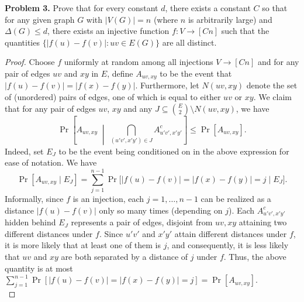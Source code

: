 \documentclass[11pt,letterpaper]{report}
\begin{document}
\noindent\textbf{Problem 3. }
Prove that for every constant $d$, there exists a constant $C$ so that for any given graph $G$ with $|V(G)| = n$ (where $n$ is arbitrarily large) and $\Delta(G)\leq d$, there exists an injective function $f: V\to [Cn]$ such that the quantities $\{|f(u)-f(v)|: uv\in E(G)\}$ are all distinct.

\begin{proof}
    Choose $f$ uniformly at random among all injections $V\to [Cn]$ and for any pair of edges $uv$ and $xy$ in $E$, define $A_{uv,xy}$ to be the event that $|f(u)-f(v)| = |f(x)-f(y)|$.
    Furthermore, let $N(uv, xy)$ denote the set of (unordered) pairs of edges, one of which is equal to either $uv$ or $xy$.
    We claim that for any pair of edges $uv$, $xy$ and any $J\subseteq \binom{E}{2}\setminus N(uv, xy)$, we have
    \[
        \Pr\left[ A_{uv, xy} \;\middle|\; \bigcap_{(u'v', x'y')\in J}A_{u'v', x'y'}^c  \right] \leq \Pr[A_{uv, xy}].
    \]
    Indeed, set $E_J$ to be the event being conditioned on in the above expression for ease of notation.
    We have
    \[
        \Pr[A_{uv,xy} \mid E_J] = \sum_{j=1}^{n-1}\Pr\bigg[|f(u)-f(v)| = |f(x)-f(y)| = j \mid E_J\bigg].
    \]
    Informally, since $f$ is an injection, each $j = 1, \ldots, n-1$ can be realized as a distance $|f(u)-f(v)|$ only so many times (depending on $j$).
    Each $A_{u'v', x'y'}^c$ hidden behind $E_J$ represents a pair of edges, disjoint from $uv, xy$ attaining two different distances under $f$.
    Since $u'v'$ and $x'y'$ attain different distances under $f$, it is more likely that at least one of them is $j$, and consequently, it is less likely that $uv$ and $xy$ are both separated by a distance of $j$ under $f$.
    Thus, the above quantity is at most $\sum_{j=1}^{n-1}\Pr[|f(u)-f(v)| = |f(x)-f(y)| = j] = \Pr[A_{uv,xy}]$.\\


\end{proof}
\end{document}
